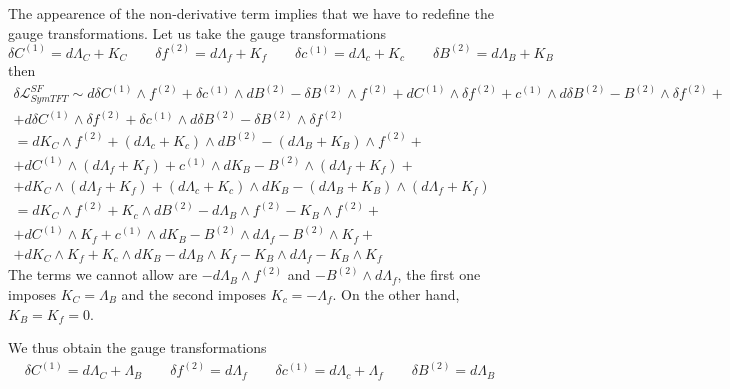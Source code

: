 \documentclass[aps,preprint,nofootinbib,preprintnumbers,eqsecnum,superscriptaddress]{revtex4}
\numberwithin{equation}{section}
\begin{document}
The appearence of the non-derivative term implies that we have to redefine the gauge transformations. Let us take the gauge transformations 
\begin{equation}
    \delta C^{(1)} = d\Lambda_C + K_C \qquad 
    \delta f^{(2)} = d\Lambda_f + K_f \qquad 
    \delta c^{(1)} = d\Lambda_c + K_c \qquad 
    \delta B^{(2)} = d\Lambda_B + K_B
\end{equation}
then
\begin{multline}
    \delta \mathcal{L}^{SF}_{SymTFT} \sim 
    d \delta C^{(1)} \wedge f^{(2)} +  \delta c^{(1)} \wedge dB^{(2)} -  \delta B^{(2)} \wedge f^{(2)} 
    + dC^{(1)} \wedge  \delta f^{(2)} + c^{(1)} \wedge d \delta B^{(2)} - B^{(2)} \wedge  \delta f^{(2)} + \\ 
    + d \delta C^{(1)} \wedge  \delta f^{(2)} +  \delta c^{(1)} \wedge d \delta B^{(2)} -  \delta B^{(2)} \wedge  \delta f^{(2)} \\
    = d K_C \wedge f^{(2)} +  (d\Lambda_c + K_c) \wedge dB^{(2)} -  (d\Lambda_B + K_B) \wedge f^{(2)} +\\
    + dC^{(1)} \wedge  (d\Lambda_f + K_f) + c^{(1)} \wedge d K_B - B^{(2)} \wedge  (d\Lambda_f + K_f) + \\ 
    + d K_C \wedge  (d\Lambda_f + K_f) +  (d\Lambda_c + K_c) \wedge d K_B -  (d\Lambda_B + K_B) \wedge  (d\Lambda_f + K_f) \\
    = d K_C \wedge f^{(2)} +  K_c \wedge dB^{(2)} -  d\Lambda_B  \wedge f^{(2)} -  K_B \wedge f^{(2)} +\\
    + dC^{(1)} \wedge  K_f + c^{(1)} \wedge d K_B - B^{(2)} \wedge  d\Lambda_f - B^{(2)} \wedge   K_f + \\ 
    + d K_C \wedge  K_f +  K_c \wedge d K_B -  d\Lambda_B  \wedge   K_f -   K_B \wedge  d\Lambda_f  - K_B\wedge K_f 
\end{multline}
The terms we cannot allow are $-  d\Lambda_B  \wedge f^{(2)}$ and $- B^{(2)} \wedge  d\Lambda_f$, the first one imposes $K_C =  \Lambda_B$ and the second imposes $K_c = - \Lambda_f$. On the other hand, $K_B=K_f=0$.

We thus obtain the gauge transformations
\begin{align}\label{eq:gauge_transf_abj}
   \delta C^{(1)} = d\Lambda_C + \Lambda_B \qquad 
    \delta f^{(2)} = d\Lambda_f  \qquad 
    \delta c^{(1)} = d\Lambda_c + \Lambda_f \qquad 
    \delta B^{(2)} = d\Lambda_B  
\end{align}
\end{document}

